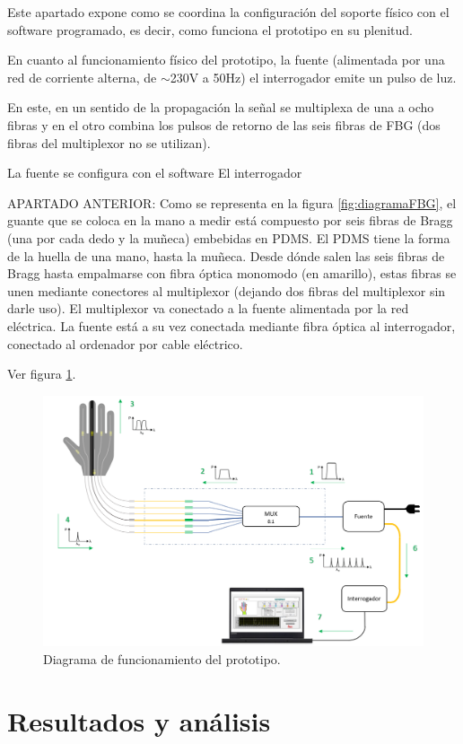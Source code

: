 Este apartado expone como se coordina la configuración del soporte físico con el software programado, es decir, como funciona el prototipo en su plenitud.

En cuanto al funcionamiento físico del prototipo, la fuente  (alimentada por una red de corriente alterna, de $\sim$230V a 50Hz) el interrogador emite un pulso de luz. 



En este, en un sentido de la propagación la señal se multiplexa de una a ocho fibras y en el otro combina los pulsos de retorno de las seis fibras de FBG (dos fibras del multiplexor no se utilizan). 

La fuente se configura con el software 
El interrogador


APARTADO ANTERIOR: 	Como se representa en la figura \ref{fig:diagramaFBG}, el guante que se coloca en la mano a medir está compuesto por seis fibras de Bragg (una por cada dedo y la muñeca) embebidas en PDMS. El PDMS tiene la forma de la huella de una mano, hasta la muñeca. Desde dónde salen las seis fibras de Bragg hasta empalmarse con fibra óptica monomodo (en amarillo), estas fibras se unen mediante conectores al multiplexor (dejando dos fibras del multiplexor sin darle uso). El multiplexor va conectado a la fuente alimentada por la red eléctrica. La fuente está a su vez conectada mediante fibra óptica al interrogador, conectado al ordenador por cable eléctrico.

Ver figura \ref{fig:diagramaFBGfuncionamiento}.

\begin{figure}[H]
	\centering
	\includegraphics[width=1\textwidth]{./img/diagramaFBGfuncionamiento}
	\caption{Diagrama de funcionamiento del prototipo.} \label{fig:diagramaFBGfuncionamiento}
\end{figure}







\section{Resultados y análisis}
\label{sec:resultados3}

